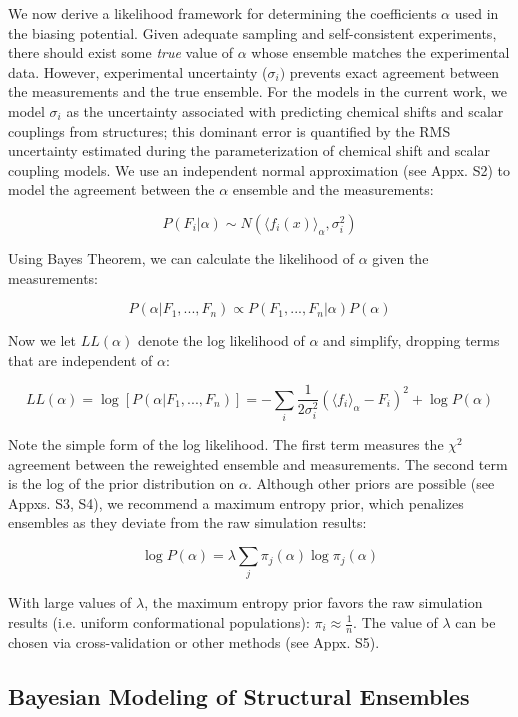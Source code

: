 \documentclass[journal=jacsat,manuscript=article]{achemso}
\begin{document}
We now derive a likelihood framework for determining the coefficients $\alpha$ used in the biasing potential.  Given adequate sampling and self-consistent experiments, there should exist some \emph{true} value of $\alpha$ whose ensemble matches the experimental data.  However, experimental uncertainty ($\sigma_i)$ prevents exact agreement between the measurements and the true ensemble.  For the models in the current work, we model $\sigma_i$ as the uncertainty associated with predicting chemical shifts and scalar couplings from structures; this dominant error is quantified by the RMS uncertainty estimated during the parameterization of chemical shift and scalar coupling models.  We use an independent normal approximation (see Appx. S2) to model the agreement between the $\alpha$ ensemble and the measurements:

$$P(F_i | \alpha) \sim N(\langle f_i(x)\rangle _\alpha, \sigma_i^2)$$

Using Bayes Theorem, we can calculate the likelihood of $\alpha$ given the measurements:

$$P(\alpha | F_1, ..., F_n) \propto P(F_1, ..., F_n | \alpha) P(\alpha)$$

Now we let $LL(\alpha)$ denote the log likelihood of $\alpha$ and simplify, dropping terms that are independent of $\alpha$:

$$LL(\alpha) = \log[ P(\alpha|F_1, ..., F_n)] = -\sum_i \frac{1}{2\sigma_i^2}(\langle f_i\rangle _\alpha - F_i)^2 + \log P(\alpha)$$

Note the simple form of the log likelihood.  The first term measures the $\chi^2$ agreement between the reweighted ensemble and measurements.  The second term is the log of the prior distribution on $\alpha$.  Although other priors are possible (see Appxs. S3, S4), we recommend a maximum entropy prior, which penalizes ensembles as they deviate from the raw simulation results:

$$\log P(\alpha) = \lambda \sum_j \pi_j(\alpha) \log \pi_j(\alpha)$$

With large values of $\lambda$, the maximum entropy prior favors the raw simulation results (i.e. uniform conformational populations): $\pi_i \approx \frac{1}{n}$.  The value of $\lambda$ can be chosen via cross-validation or other methods (see Appx. S5).  

\subsection{Bayesian Modeling of Structural Ensembles}
\end{document}
